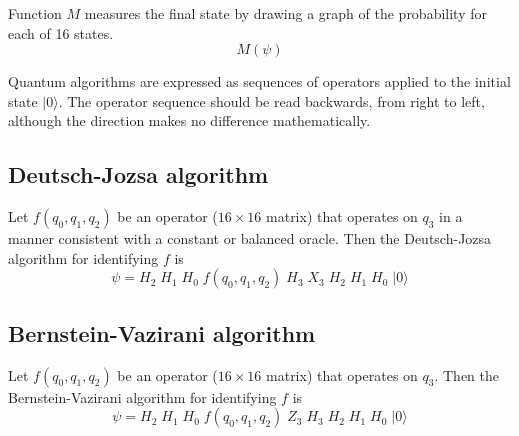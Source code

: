 \documentclass[12pt]{article}
\begin{document}
\bigskip
\noindent
Function $M$ measures the final state by drawing a graph of the probability
for each of 16 states.
\begin{equation*}
M(\psi)
\end{equation*}

\noindent
Quantum algorithms are expressed as sequences of operators applied
to the initial state $|0\rangle$.
The operator sequence should be read backwards, from right to left,
although the direction makes no difference mathematically.

\subsection*{Deutsch-Jozsa algorithm}
Let $f(q_0,q_1,q_2)$ be an operator ($16\times16$ matrix) that operates on $q_3$
in a manner consistent with a constant or balanced oracle.
Then the Deutsch-Jozsa algorithm for identifying $f$ is
\begin{equation*}
\psi = H_2 \; H_1 \; H_0 \; f(q_0,q_1,q_2) \; H_3 \; X_3 \; H_2 \; H_1 \; H_0 \; |0\rangle
\end{equation*}

\subsection*{Bernstein-Vazirani algorithm}
Let $f(q_0,q_1,q_2)$ be an operator ($16\times16$ matrix) that operates on $q_3$.
Then the Bernstein-Vazirani algorithm for identifying $f$ is
\begin{equation*}
\psi = H_2 \; H_1 \; H_0 \; f(q_0,q_1,q_2) \; Z_3 \; H_3 \; H_2 \; H_1 \; H_0 \; |0\rangle
\end{equation*}
\end{document}
